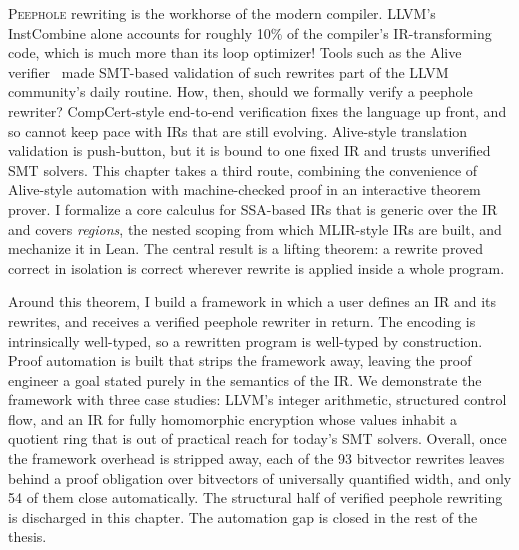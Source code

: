 \lettrine{P}{eephole} rewriting is the workhorse of the modern compiler.
LLVM's InstCombine alone accounts for roughly 10\% of the compiler's
IR-transforming code, which is much more than its loop optimizer!
Tools such as the Alive verifier~\citep{lopes2021alive2} made SMT-based validation of such rewrites
part of the LLVM community's daily routine. How, then, should we formally verify a
peephole rewriter? 
CompCert-style end-to-end verification fixes the language up front, and so
cannot keep pace with IRs that are still evolving.
Alive-style translation validation is push-button, but it is bound to one fixed IR and trusts unverified SMT solvers.
This chapter takes a third route, combining the convenience of Alive-style automation with
machine-checked proof in an interactive theorem prover. I formalize a core
calculus for SSA-based IRs that is generic over the IR and covers
\emph{regions}, the nested scoping from which MLIR-style IRs are built, and
mechanize it in Lean. The central result is a lifting theorem: a rewrite proved
correct in isolation is correct wherever rewrite is applied inside a whole
program.

Around this theorem, I build a framework in which a user defines an IR and its rewrites,
and receives a verified peephole rewriter in return.
The encoding is intrinsically well-typed, so a rewritten program is well-typed by construction.
Proof automation is built that strips the framework away, leaving the proof engineer
a goal stated purely in the semantics of the IR.
We demonstrate the framework with three case studies:
LLVM's integer arithmetic, structured control flow, and an IR for
fully homomorphic encryption whose values inhabit a quotient ring that is out
of practical reach for today's SMT solvers. 
Overall, once the framework overhead is stripped away,
each of the 93 bitvector rewrites leaves behind a
proof obligation over bitvectors of universally quantified width, and only 54
of them close automatically. The structural half of verified peephole rewriting
is discharged in this chapter.
The automation gap is closed in the rest of the thesis.

